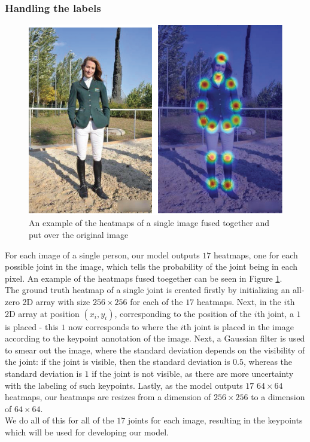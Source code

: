 \documentclass[./main.tex]{subfiles}
\begin{document}
\subsubsection{Handling the labels}
\begin{figure}[H]
    \centering
    \includegraphics[height = 4 cm]{./entities/heatmaps_ex.PNG}
    \caption{An example of the heatmaps of a single image fused together and put over the original image \cite{survey_1}}
    \label{fig:heatmaps_ex}
\end{figure}
For each image of a single person, our model outputs $17$ heatmaps, one for each possible joint in the image, which tells the probability of the joint being in each pixel. An example of the heatmaps fused toegether can be seen in Figure \ref{fig:heatmaps_ex}. \\
The ground truth heatmap of a single joint is created firstly by initializing an all-zero 2D array with size $256 \times 256$ for each of the $17$ heatmaps. Next, in the $i$th 2D array at position $(x_i, y_i)$, corresponding to the position of the $i$th joint, a $1$ is placed - this $1$ now corresponds to where the $i$th joint is placed in the image according to the keypoint annotation of the image. Next, a Gaussian filter is used to smear out the image, where the standard deviation depends on the visibility of the joint: if the joint is visible, then the standard deviation is $0.5$, whereas the standard deviation is $1$ if the joint is not visible, as there are more uncertainty with the labeling of such keypoints. Lastly, as the model outputs $17$ $64 \times 64$ heatmaps, our heatmaps are resizes from a dimension of $256 \times 256$ to a dimension of $64 \times 64$. \\
We do all of this for all of the $17$ joints for each image, resulting in the keypoints which will be used for developing our model.
\end{document}
